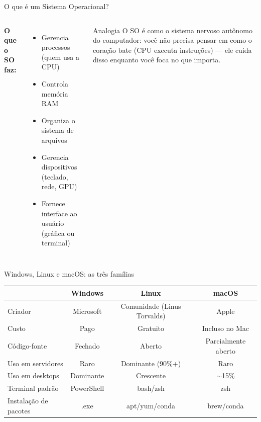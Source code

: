 \begin{frame}[shrink=10]{O que é um Sistema Operacional?}

\vspace{0.3cm}

\begin{columns}
\textbf{O que o SO faz:}
\begin{itemize}
    \item Gerencia processos (quem usa a CPU)
    \item Controla memória RAM
    \item Organiza o sistema de arquivos
    \item Gerencia dispositivos (teclado, rede, GPU)
    \item Fornece interface ao usuário (gráfica ou terminal)
\end{itemize}

\begin{exampleblock}{Analogia}
O SO é como o sistema nervoso autônomo do computador: você não precisa pensar em como o coração bate (CPU executa instruções) — ele cuida disso enquanto você foca no que importa.
\end{exampleblock}
\end{columns}
\end{frame}

\begin{frame}[shrink=10]{Windows, Linux e macOS: as três famílias}
\begin{center}
\begin{tabular}{lccc}
\toprule
& \textbf{Windows} & \textbf{Linux} & \textbf{macOS} \\
\midrule
Criador         & Microsoft   & Comunidade (Linus Torvalds) & Apple \\
Custo           & Pago        & Gratuito        & Incluso no Mac \\
Código-fonte    & Fechado     & Aberto          & Parcialmente aberto \\
Uso em servidores & Raro     & Dominante (90\%+) & Raro \\
Uso em desktops & Dominante  & Crescente       & $\sim$15\% \\
Terminal padrão & PowerShell  & bash/zsh        & zsh \\
Instalação de pacotes & .exe  & apt/yum/conda  & brew/conda \\
\bottomrule
\end{tabular}
\end{center}

\vspace{0.2cm}
\end{frame}

